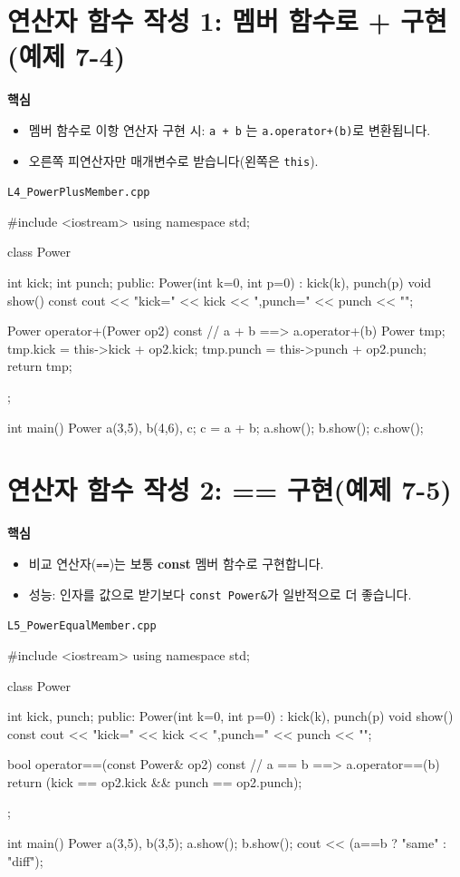 \documentclass[11pt,a4paper]{article}
\newcommand{\filetag}[1]{\texttt{\color{Accent}#1}}
\begin{document}
\section{연산자 함수 작성 1: 멤버 함수로 + 구현(예제 7-4)}
\begin{GoalBox}
\textbf{핵심}
\begin{itemize}[leftmargin=18pt]
  \item 멤버 함수로 이항 연산자 구현 시: \texttt{a + b} 는 \texttt{a.operator+(b)}로 변환됩니다.
  \item 오른쪽 피연산자만 매개변수로 받습니다(왼쪽은 \texttt{this}).
\end{itemize}
\end{GoalBox}

\noindent\filetag{L4\_PowerPlusMember.cpp}
\begin{cppcode}
#include <iostream>
using namespace std;

class Power {
    int kick;
    int punch;
public:
    Power(int k=0, int p=0) : kick(k), punch(p) {}
    void show() const { cout << "kick=" << kick << ",punch=" << punch << "\n"; }

    Power operator+(Power op2) const { // a + b  ==> a.operator+(b)
        Power tmp;
        tmp.kick = this->kick + op2.kick;
        tmp.punch = this->punch + op2.punch;
        return tmp;
    }
};

int main() {
    Power a(3,5), b(4,6), c;
    c = a + b;
    a.show(); b.show(); c.show();
}
\end{cppcode}

\section{연산자 함수 작성 2: == 구현(예제 7-5)}
\begin{GoalBox}
\textbf{핵심}
\begin{itemize}[leftmargin=18pt]
  \item 비교 연산자(\texttt{==})는 보통 \textbf{const} 멤버 함수로 구현합니다.
  \item 성능: 인자를 값으로 받기보다 \texttt{const Power\&}가 일반적으로 더 좋습니다.
\end{itemize}
\end{GoalBox}

\noindent\filetag{L5\_PowerEqualMember.cpp}
\begin{cppcode}
#include <iostream>
using namespace std;

class Power {
    int kick, punch;
public:
    Power(int k=0, int p=0) : kick(k), punch(p) {}
    void show() const { cout << "kick=" << kick << ",punch=" << punch << "\n"; }

    bool operator==(const Power& op2) const { // a == b  ==> a.operator==(b)
        return (kick == op2.kick && punch == op2.punch);
    }
};

int main() {
    Power a(3,5), b(3,5);
    a.show(); b.show();
    cout << (a==b ? "same\n" : "diff\n");
}
\end{cppcode}
\end{document}
